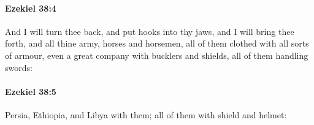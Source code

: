 		\paragraph{Ezekiel 38:4} %
			\label{EZEKIEL-38-4}

			And I will turn thee back, and put hooks into thy jaws, and I will bring thee forth, and all thine army, horses and horsemen, all of them clothed with all sorts of armour, even a great company with bucklers and shields, all of them handling swords:


		\paragraph{Ezekiel 38:5} %
			\label{EZEKIEL-38-5}

			Persia, Ethiopia, and Libya with them; all of them with shield and helmet:


